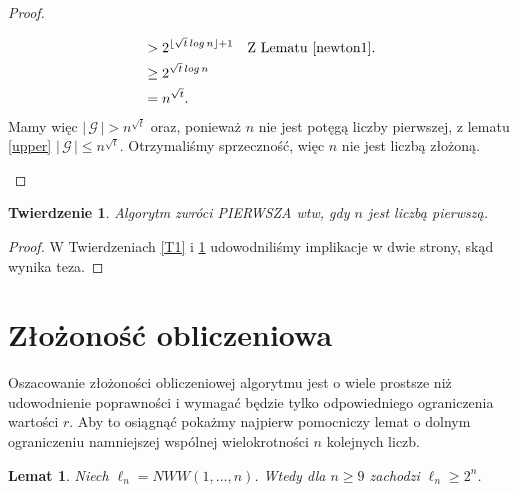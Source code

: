\documentclass[declaration,shortabstract]{iithesis}
\theoremstyle{definition}
\theoremstyle{remark} \newtheorem{observation}{Obserwacja}
\theoremstyle{plain} \newtheorem{theorem}{Twierdzenie}
\theoremstyle{plain} \newtheorem{lemma}{Lemat}
\theoremstyle{remark} \newtheorem*{remark*}{Uwaga}
\theoremstyle{reminder} \newtheorem*{reminder*}{Przypomnienie}
\begin{document}
\begin{proof}
\begin{enumerate}[label=\arabic*.,leftmargin=.4in]
\begin{align*}
		      	  & > 2^{\lfloor \sqrt{t}\, log \, n \rfloor + 1}                                               &   & \text{Z Lematu \ref{newton1}.}                                                                                                                 \\
		      	&\geq 2^{\sqrt{t}\,log \,n} \\
		      	&= n^{\sqrt{t}}.
		      \end{align*}
		      Mamy więc $| \, \mathcal{G} \, | > n ^{\sqrt{t}}$ oraz, ponieważ $n$ nie jest potęgą liczby pierwszej, z lematu \ref{upper} $| \, \mathcal{G} \, | \leq n^{\sqrt{t}}.$ Otrzymaliśmy sprzeczność, więc $n$ nie jest liczbą złożoną.
	\end{enumerate}
\end{proof}
	
\begin{theorem} \label{T2}
	Algorytm zwróci \textit{PIERWSZA} wtw, gdy $n$ jest liczbą pierwszą.
\end{theorem}
	
\begin{proof}
	W Twierdzeniach \ref{T1} i \ref{T2} udowodniliśmy implikacje w dwie strony, skąd wynika teza.
\end{proof}
	
\section{Złożoność obliczeniowa}
    
Oszacowanie złożoności obliczeniowej algorytmu jest o wiele prostsze niż udowodnienie poprawności i wymagać będzie tylko odpowiedniego ograniczenia wartości $r$. Aby to osiągnąć pokażmy najpierw pomocniczy lemat o dolnym ograniczeniu namniejszej wspólnej wielokrotności $n$ kolejnych liczb.

\begin{lemma} \label{3.1}
	Niech $\ell_n = NWW(1, \dots, n)$. Wtedy dla $n \geq 9$ zachodzi $\ell_n \geq 2^n$.
\end{lemma}
	
\end{document}
